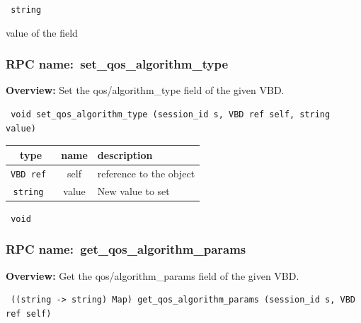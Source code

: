 \vspace{0.3cm}

{\tt 
string
}


value of the field
\vspace{0.3cm}
\vspace{0.3cm}
\vspace{0.3cm}
\subsubsection{RPC name:~set\_qos\_algorithm\_type}

{\bf Overview:} 
Set the qos/algorithm\_type field of the given VBD.

\begin{verbatim} void set_qos_algorithm_type (session_id s, VBD ref self, string value)\end{verbatim}



 
\vspace{0.3cm}
\begin{tabular}{|c|c|p{7cm}|}
 \hline
{\bf type} & {\bf name} & {\bf description} \\ \hline
{\tt VBD ref } & self & reference to the object \\ \hline 

{\tt string } & value & New value to set \\ \hline 

\end{tabular}

\vspace{0.3cm}

{\tt 
void
}



\vspace{0.3cm}
\vspace{0.3cm}
\vspace{0.3cm}
\subsubsection{RPC name:~get\_qos\_algorithm\_params}

{\bf Overview:} 
Get the qos/algorithm\_params field of the given VBD.

\begin{verbatim} ((string -> string) Map) get_qos_algorithm_params (session_id s, VBD ref self)\end{verbatim}


